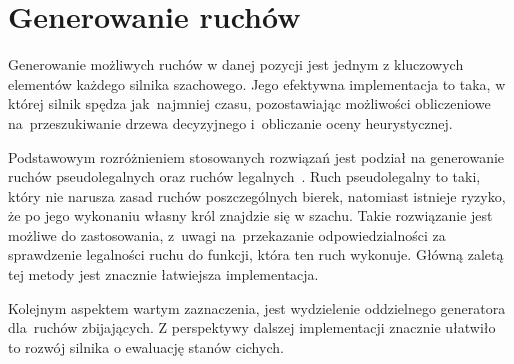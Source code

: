 \newpage
\section{Generowanie ruchów}
\label{sec:generowanie-ruchow}

Generowanie możliwych ruchów w danej pozycji jest jednym z kluczowych elementów każdego silnika szachowego.
Jego efektywna implementacja to taka, w której silnik spędza jak~najmniej czasu, pozostawiając możliwości obliczeniowe na~przeszukiwanie drzewa decyzyjnego i~obliczanie oceny heurystycznej.

Podstawowym rozróżnieniem stosowanych rozwiązań jest podział na generowanie ruchów pseudolegalnych oraz ruchów legalnych~\cite*{wiki-movegen}.
Ruch pseudolegalny to taki, który nie narusza zasad ruchów poszczególnych bierek, natomiast istnieje ryzyko, że po jego wykonaniu własny król znajdzie się w szachu.
Takie rozwiązanie jest możliwe do zastosowania, z~uwagi na~przekazanie odpowiedzialności za sprawdzenie legalności ruchu do funkcji, która ten ruch wykonuje.
Główną zaletą tej metody jest znacznie łatwiejsza implementacja.

Kolejnym aspektem wartym zaznaczenia, jest wydzielenie oddzielnego generatora dla~ruchów zbijających.
Z perspektywy dalszej implementacji znacznie ułatwiło to rozwój silnika o ewaluację stanów cichych.




